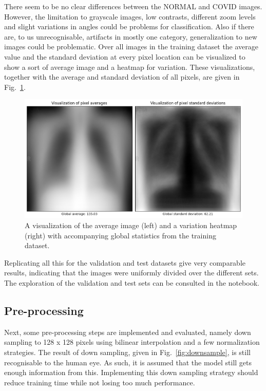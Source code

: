 \documentclass[conference]{IEEEtran}
\begin{document}
There seem to be no clear differences between the NORMAL and COVID images. However, the limitation to grayscale images, low contrasts, different zoom levels and slight variations in angles could be problems for classification. Also if there are, to us unrecognisable, artifacts in mostly one category, generalization to new images could be problematic.
Over all images in the training dataset the average value and the standard deviation at every pixel location can be visualized to show a sort of average image and a heatmap for variation. These visualizations, together with the average and standard deviation of all pixels, are given in Fig.~\ref{fig:pixel_statistics}.

\begin{figure}[htbp]
\centerline{\includegraphics[width=\linewidth]{Images/pixel_statistics.png}}
\caption{A visualization of the average image (left) and a variation heatmap (right) with accompanying global statistics from the training dataset.}
\label{fig:pixel_statistics}
\end{figure}

Replicating all this for the validation and test datasets give very comparable results, indicating that the images were uniformly divided over the different sets. The exploration of the validation and test sets can be consulted in the notebook.

\subsection{Pre-processing}
Next, some pre-processing steps are implemented and evaluated, namely down sampling to 128 x 128 pixels using bilinear interpolation and a few normalization strategies. The result of down sampling, given in Fig.~\ref{fig:downsample}, is still recognisable to the human eye. As such, it is assumed that the model still gets enough information from this. Implementing this down sampling strategy should reduce training time while not losing too much performance.
\end{document}
